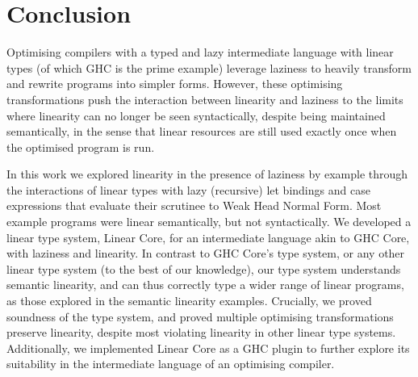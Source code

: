 \documentclass[acmsmall, screen, review]{acmart}
\begin{document}
%
%
% 
% 
% 
% 
% 
% 
% 
% 

\section{Conclusion}

Optimising compilers with a typed and lazy intermediate language with linear
types (of which GHC is the prime example) leverage laziness to heavily
transform and rewrite programs into simpler forms.
%
However, these optimising transformations push the interaction between
linearity and laziness to the limits where linearity can no longer be seen
syntactically, despite being maintained semantically, in the sense that linear
resources are still used exactly once when the optimised program is run.

In this work we explored linearity in the presence of laziness by example
through the interactions of linear types with lazy (recursive) let bindings and
case expressions that evaluate their scrutinee to Weak Head Normal Form. Most
example programs were linear semantically, but not syntactically.
%
We developed a linear type system, Linear Core, for an intermediate language
akin to GHC Core, with laziness and linearity. In contrast to GHC Core's type
system, or any other linear type system (to the best of our knowledge), our
type system understands semantic linearity, and can thus correctly type a wider
range of linear programs, as those explored in the semantic linearity examples.
%
Crucially, we proved soundness of the type system, and proved multiple
optimising transformations preserve linearity, despite most violating linearity
in other linear type systems. Additionally, we implemented Linear Core as a GHC
plugin to further explore its suitability in the intermediate language of an
optimising compiler.
\end{document}
